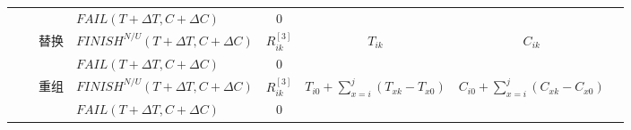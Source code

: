 \begin{table}[htbp]
\begin{lrbox}{\tablebox}
\begin{tabular}{llllllll}
        \multicolumn{1}{|c|}{} 
        &       
        & \multicolumn{1}{|c}{}
        & \multicolumn{1}{|l}{$FAIL(T+\Delta T,C+\Delta C)$} 
        & \multicolumn{1}{|c}{0} 
        & \multicolumn{1}{|c}{}
        & \multicolumn{1}{|c|}{} \\
        \cline{3-7}

        \multicolumn{1}{|c|}{} 
        &       
        & \multicolumn{1}{|c}{\multirow{2}{*}{替换}} 
        & \multicolumn{1}{|l}{$FINISH^{N/U}(T+\Delta T,C+\Delta C)$} 
        & \multicolumn{1}{|c}{$R_{ik}^{[3]}$} 
        & \multicolumn{1}{|c}{\multirow{2}{*}{${T_{ik}}$}} 
        & \multicolumn{1}{|c|}{\multirow{2}{*}{${C_{ik}}$}} \\

        \multicolumn{1}{|c|}{} 
        &       
        & \multicolumn{1}{|c}{} 
        & \multicolumn{1}{|l}{$FAIL(T+\Delta T,C+\Delta C)$} 
        & \multicolumn{1}{|c}{0} 
        & \multicolumn{1}{|c}{} 
        & \multicolumn{1}{|c|}{} \\
        \cline{3-7}

        \multicolumn{1}{|c|}{} 
        &       
        & \multicolumn{1}{|c}{\multirow{2}{*}{重组}} 
        & \multicolumn{1}{|l}{$FINISH^{N/U}(T+\Delta T,C+\Delta C)$} 
        & \multicolumn{1}{|c}{$R_{ik}^{[3]}$} 
        & \multicolumn{1}{|c}{\multirow{2}{*}{${T_{i0}} + \sum\limits_{x = i}^j {({T_{xk}} - {T_{x0}})} $}}
        & \multicolumn{1}{|c|}{\multirow{2}{*}{${C_{i0}} + \sum\limits_{x = i}^j {({C_{xk}} - {C_{x0}})} $}} \\

        \multicolumn{1}{|c|}{} 
        &       
        & \multicolumn{1}{|c}{} 
        & \multicolumn{1}{|l}{$FAIL(T+\Delta T,C+\Delta C)$} 
        & \multicolumn{1}{|c}{0} 
        & \multicolumn{1}{|c}{} 
        & \multicolumn{1}{|c|}{} \\
        \cline{2-7}


\end{tabular}
\end{lrbox}
\end{table}
